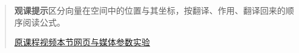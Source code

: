 \begin{quote}\small\textbf{观课提示}\quad 区分向量在空间中的位置与其坐标，按翻译、作用、翻译回来的顺序阅读公式。

\href{https://www.youtube.com/watch?v=P2LTAUO1TdA}{原课程视频}\quad\href{https://vitael04213.github.io/3blue1brown-notes/lessons/change-of-basis.html}{本节网页与媒体}\quad\href{https://vitael04213.github.io/3blue1brown-notes/lab.html\#eigen}{参数实验}
\end{quote}
